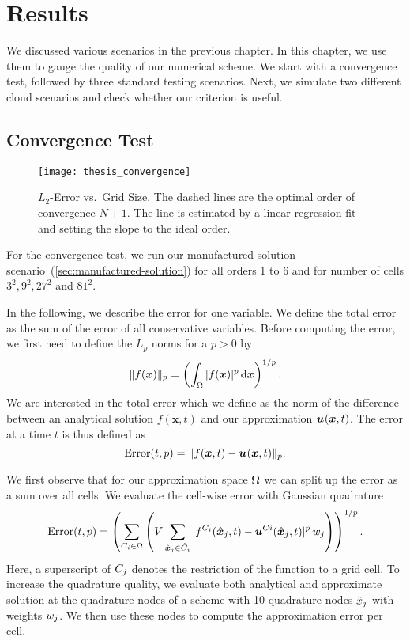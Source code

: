 \chapter{Results}\label{chap:results}
We discussed various scenarios in the previous chapter.
In this chapter, we use them to gauge the quality of our numerical scheme.
We start with a convergence test, followed by three standard testing scenarios.
Next, we simulate two different cloud scenarios and check whether our \amr{} criterion is useful.

\newcommand{\error}{\operatorname{Error}}%
\section{Convergence Test}\label{sec:results-convergence}
\begin{figure}[hb]
  \centering
  \texttt{[image: thesis\_convergence]}
  \caption{\label{fig:convergence-l2-error}%
    $L_2$-Error vs.\ Grid Size.
    The dashed lines are the optimal order of convergence $N+1$.
  The line is estimated by a linear regression fit and setting the slope to the ideal order.}
\end{figure}
For the convergence test, we run our manufactured solution scenario~(\cref{sec:manufactured-solution}) for all orders 1 to 6 and for number of cells $3^2, 9^2, 27^2$ and $81^2 $.

In the following, we describe the error for one variable.
We define the total error as the sum of the error of all conservative variables.
Before computing the error, we first need to define the $L_p$ norms for a $p > 0$ by
\begin{equation}
  \label{eq:Lp-nrom}
  \Vert f(\bm{x}) \Vert_p = \left( \intddomain{ \vert f(\bm{x}) \vert^p}  \right)^{1/p}.
\end{equation}
We are interested in the total error which we define as the norm of the difference between an analytical solution $f(\bm{x}, t)$ and our approximation $\ssol(\bm{x}, t)$.
The error at a time $t$ is thus defined as
\begin{equation}
  \label{eq:error}
  \error(t,p) = \Vert f(\bm{x}, t) - \ssol (\bm{x}, t) \Vert_p.
\end{equation}

We first observe that for our approximation space $\broken$ we can split up the error as a sum over all cells.
We evaluate the cell-wise error with Gaussian quadrature~
 \begin{equation}
   \error(t,p) = 
   \left( \sum_{\cell[i] \in \broken}
    \left( V \sum_{\quadNodeNd[j] \in \refCell[i]} \vert f^{\cell[i]}(\quadNodeNd[j], t) - \ssol[\cell{i}](\quadNodeNd[j], t) \vert^p \, \quadWeight[j] \right) \right)^{1/p}.
 \end{equation}
Here, a superscript of $\cell[j]$ denotes the restriction of the function to a grid cell.
To increase the quadrature quality, we evaluate both analytical and approximate solution at the quadrature nodes of a scheme with 10 quadrature nodes $\quadNode[j]$ with weights $\quadWeight[j]$.
We then use these nodes to compute the approximation error per cell.

